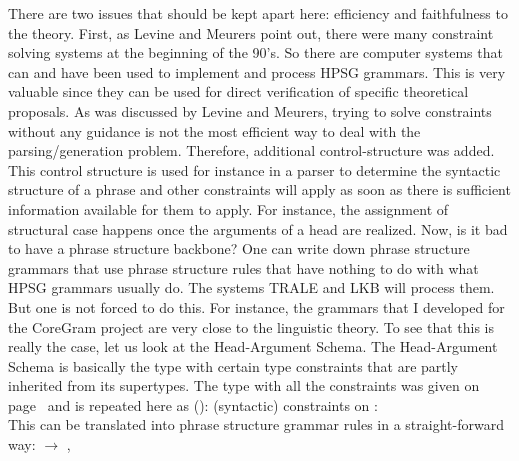 \largerpage
There are two issues that should be kept apart here: efficiency and faithfulness to the
theory. First, as Levine and Meurers point out, there were many constraint solving systems at the
beginning of the 90's. So there are computer systems that can and have been used to implement
and process HPSG grammars. This is very valuable since they can be used for direct verification of
specific theoretical proposals. As was discussed by Levine and Meurers, trying to solve constraints
without any guidance is not the most efficient way to deal with the parsing/generation
problem. Therefore, additional control-structure was added. This control structure is used for
instance in a parser to determine the syntactic structure of a phrase and other constraints will
apply as soon as there is sufficient information available for them to apply. For instance, the
assignment of structural case happens once the arguments of a head are realized. Now, is it bad to
have a phrase structure backbone? One can write down phrase structure grammars that use phrase
structure rules that have nothing to do with what HPSG grammars usually do. The systems TRALE \citep*{MPR2002a-u,Penn2004a-u} and
LKB will process them. But one is not forced to do this. For instance, the grammars that I developed
for the CoreGram project \citep{MuellerCoreGramBrief,MuellerCoreGram} are very close to the linguistic theory. To see that this is really the
case, let us look at the Head-Argument Schema. The Head-Argument Schema is basically the type
 with certain type constraints that are partly inherited from its
supertypes. The type with all the constraints was given on page~\pageref{head-arg-schema-hfp} and is
repeated here as ():
\eas
\label{head-arg-schema-hfp-zwei}
(syntactic) constraints on :\\
\zs
This can be translated into phrase structure grammar rules in a straight-forward way:
\eal
\ex {} $\to$ , 
